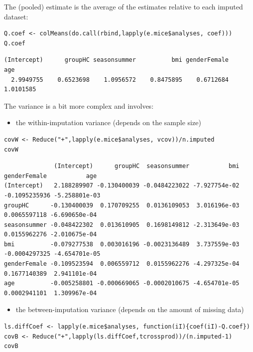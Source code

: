 \documentclass[12pt]{article}
\begin{document}
The (pooled) estimate is the average of the estimates relative to each
imputed dataset:
\lstset{language=r,label= ,caption= ,captionpos=b,numbers=none}
\begin{lstlisting}
Q.coef <- colMeans(do.call(rbind,lapply(e.mice$analyses, coef)))
Q.coef
\end{lstlisting}

\begin{verbatim}
(Intercept)      groupHC seasonsummer          bmi genderFemale          age 
  2.9949755    0.6523698    1.0956572    0.8475895    0.6712684    1.0101585
\end{verbatim}

The variance is a bit more complex and involves:
\begin{itemize}
\item the within-imputation variance (depends on the sample size)
\end{itemize}
\lstset{language=r,label= ,caption= ,captionpos=b,numbers=none}
\begin{lstlisting}
covW <- Reduce("+",lapply(e.mice$analyses, vcov))/n.imputed
covW
\end{lstlisting}

\begin{verbatim}
              (Intercept)      groupHC  seasonsummer           bmi  genderFemale           age
(Intercept)   2.188289907 -0.130400039 -0.0484223022 -7.927754e-02 -0.1095235936 -5.258801e-03
groupHC      -0.130400039  0.170709255  0.0136109053  3.016196e-03  0.0065597118 -6.690650e-04
seasonsummer -0.048422302  0.013610905  0.1698149812 -2.313649e-03  0.0155962276 -2.010675e-04
bmi          -0.079277538  0.003016196 -0.0023136489  3.737559e-03 -0.0004297325 -4.654701e-05
genderFemale -0.109523594  0.006559712  0.0155962276 -4.297325e-04  0.1677140389  2.941101e-04
age          -0.005258801 -0.000669065 -0.0002010675 -4.654701e-05  0.0002941101  1.309967e-04
\end{verbatim}

\begin{itemize}
\item the between-imputation variance (depends on the amount of missing data)
\end{itemize}
\lstset{language=r,label= ,caption= ,captionpos=b,numbers=none}
\begin{lstlisting}
ls.diffCoef <- lapply(e.mice$analyses, function(iI){coef(iI)-Q.coef})
covB <- Reduce("+",lapply(ls.diffCoef,tcrossprod))/(n.imputed-1)
covB
\end{lstlisting}
\end{document}
